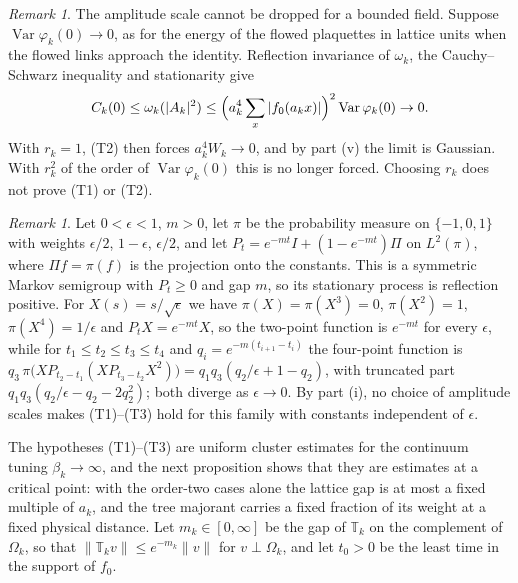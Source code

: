\documentclass[11pt]{amsart}
\theoremstyle{definition}
\theoremstyle{remark}
\newtheorem{remark}[theorem]{Remark}
\numberwithin{equation}{section}
\begin{document}
\begin{remark}\label{rem:amplitude}
The amplitude scale cannot be dropped for a bounded field. Suppose
$\operatorname{Var}\varphi_k(0)\to0$, as for the energy of the flowed
plaquettes in lattice units when the flowed links approach the identity.
Reflection invariance of $\omega_k$, the Cauchy--Schwarz inequality and
stationarity give
\[
C_k(0)\le\omega_k(|A_k|^2)\le\Bigl(a_k^4\sum_x|f_0(a_kx)|\Bigr)^2
\operatorname{Var}\varphi_k(0)\to0 .
\]
With $r_k=1$, (T2) then forces $a_k^4W_k\to0$, and by part (v) the limit is
Gaussian. With $r_k^2$ of the order of $\operatorname{Var}\varphi_k(0)$ this
is no longer forced. Choosing $r_k$ does not prove (T1) or (T2).
\end{remark}

\begin{remark}\label{rem:markov}
Let $0<\epsilon<1$, $m>0$, let $\pi$ be the probability measure on
$\{-1,0,1\}$ with weights $\epsilon/2$, $1-\epsilon$, $\epsilon/2$, and let
$P_t=e^{-mt}I+(1-e^{-mt})\Pi$ on $L^2(\pi)$, where $\Pi f=\pi(f)$ is the
projection onto the constants. This is a symmetric Markov semigroup with
$P_t\ge0$ and gap $m$, so its stationary process is reflection positive. For
$X(s)=s/\sqrt\epsilon$ we have $\pi(X)=\pi(X^3)=0$, $\pi(X^2)=1$,
$\pi(X^4)=1/\epsilon$ and $P_tX=e^{-mt}X$, so the two-point function is
$e^{-mt}$ for every $\epsilon$, while for $t_1\le t_2\le t_3\le t_4$ and
$q_i=e^{-m(t_{i+1}-t_i)}$ the four-point function is
$q_3\,\pi\bigl(XP_{t_2-t_1}(XP_{t_3-t_2}X^2)\bigr)=q_1q_3(q_2/\epsilon+1-q_2)$,
with truncated part $q_1q_3(q_2/\epsilon-q_2-2q_2^2)$; both diverge as
$\epsilon\to0$. By part (i), no choice of amplitude scales makes
(T1)--(T3) hold for this family with constants independent of $\epsilon$.
\end{remark}

The hypotheses (T1)--(T3) are uniform cluster estimates for the continuum
tuning $\beta_k\to\infty$, and the next proposition shows that they are
estimates at a critical point: with the order-two cases alone the lattice
gap is at most a fixed multiple of $a_k$, and the tree majorant carries a fixed fraction
of its weight at a fixed physical distance. Let $m_k\in[0,\infty]$ be the
gap of $\mathbb T_k$ on the complement of $\Omega_k$, so that
$\|\mathbb T_kv\|\le e^{-m_k}\|v\|$ for $v\perp\Omega_k$, and let $t_0>0$ be
the least time in the support of $f_0$.
\end{document}
